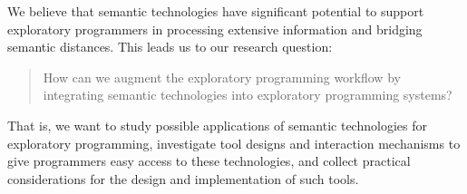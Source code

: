 We believe that semantic technologies have significant potential to support exploratory programmers in processing extensive information and bridging semantic distances.
%
%
%
This leads us to our research question:
%
\begin{quote}
	How can we augment the exploratory programming workflow by integrating semantic technologies into exploratory programming systems?
\end{quote}

That is, we want to study possible applications of semantic technologies for exploratory programming, investigate tool designs and interaction mechanisms to give programmers easy access to these technologies, and collect practical considerations for the design and implementation of such tools.

